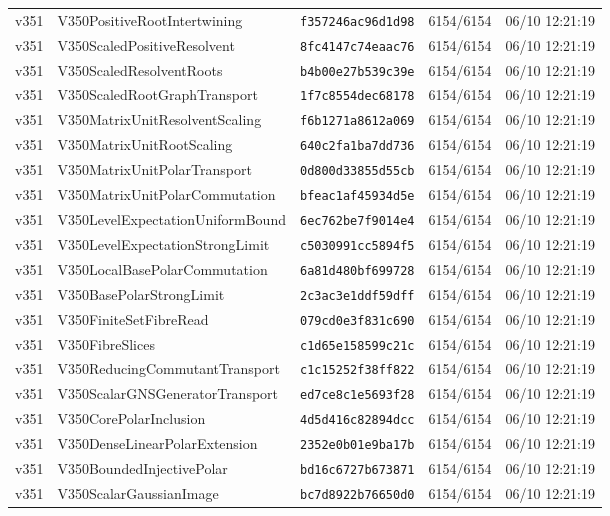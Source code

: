 \documentclass[11pt]{article}
\theoremstyle{definition}\newtheorem{deriv}{Derivation}
\begin{document}
{\begin{longtable}{@{}lllll@{}}
v351 & V350PositiveRootIntertwining & \texttt{f357246ac96d1d98} & 6154/6154 & 06/10 12:21:19 \\
v351 & V350ScaledPositiveResolvent & \texttt{8fc4147c74eaac76} & 6154/6154 & 06/10 12:21:19 \\
v351 & V350ScaledResolventRoots & \texttt{b4b00e27b539c39e} & 6154/6154 & 06/10 12:21:19 \\
v351 & V350ScaledRootGraphTransport & \texttt{1f7c8554dec68178} & 6154/6154 & 06/10 12:21:19 \\
v351 & V350MatrixUnitResolventScaling & \texttt{f6b1271a8612a069} & 6154/6154 & 06/10 12:21:19 \\
v351 & V350MatrixUnitRootScaling & \texttt{640c2fa1ba7dd736} & 6154/6154 & 06/10 12:21:19 \\
v351 & V350MatrixUnitPolarTransport & \texttt{0d800d33855d55cb} & 6154/6154 & 06/10 12:21:19 \\
v351 & V350MatrixUnitPolarCommutation & \texttt{bfeac1af45934d5e} & 6154/6154 & 06/10 12:21:19 \\
v351 & V350LevelExpectationUniformBound & \texttt{6ec762be7f9014e4} & 6154/6154 & 06/10 12:21:19 \\
v351 & V350LevelExpectationStrongLimit & \texttt{c5030991cc5894f5} & 6154/6154 & 06/10 12:21:19 \\
v351 & V350LocalBasePolarCommutation & \texttt{6a81d480bf699728} & 6154/6154 & 06/10 12:21:19 \\
v351 & V350BasePolarStrongLimit & \texttt{2c3ac3e1ddf59dff} & 6154/6154 & 06/10 12:21:19 \\
v351 & V350FiniteSetFibreRead & \texttt{079cd0e3f831c690} & 6154/6154 & 06/10 12:21:19 \\
v351 & V350FibreSlices & \texttt{c1d65e158599c21c} & 6154/6154 & 06/10 12:21:19 \\
v351 & V350ReducingCommutantTransport & \texttt{c1c15252f38ff822} & 6154/6154 & 06/10 12:21:19 \\
v351 & V350ScalarGNSGeneratorTransport & \texttt{ed7ce8c1e5693f28} & 6154/6154 & 06/10 12:21:19 \\
v351 & V350CorePolarInclusion & \texttt{4d5d416c82894dcc} & 6154/6154 & 06/10 12:21:19 \\
v351 & V350DenseLinearPolarExtension & \texttt{2352e0b01e9ba17b} & 6154/6154 & 06/10 12:21:19 \\
v351 & V350BoundedInjectivePolar & \texttt{bd16c6727b673871} & 6154/6154 & 06/10 12:21:19 \\
v351 & V350ScalarGaussianImage & \texttt{bc7d8922b76650d0} & 6154/6154 & 06/10 12:21:19 \\

\end{longtable}}
\end{document}
